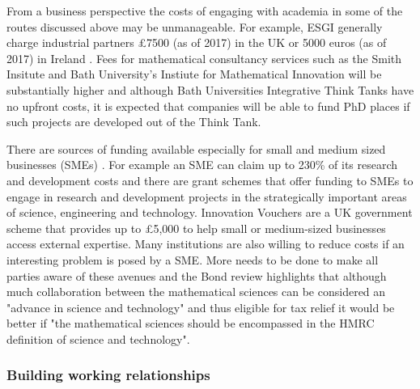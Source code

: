 \documentclass[11pt]{article} %
\begin{document}
	From a business perspective the costs of engaging with academia in some of the routes discussed above may be unmanageable. For example, ESGI generally charge industrial partners  £7500 (as of 2017) in the UK or 5000  euros (as of 2017) in Ireland \cite{ESGIhandbook}. Fees for mathematical consultancy services such as the Smith Insitute and Bath University's Instiute for Mathematical Innovation will be substantially higher and although Bath Universities Integrative Think Tanks have no upfront costs, it is expected that companies will be able to fund PhD places if such projects are developed out of the Think Tank. 
	
	There are sources of funding available especially for small and medium sized businesses (SMEs) \cite{IMI}. For example an SME can claim up to 230\% of its research and development costs \cite{Gov}  and there are grant schemes that offer funding to SMEs to engage in research and development projects in the strategically important areas of science, engineering and technology. Innovation Vouchers are a UK government scheme that	provides up to £5,000 to help small or medium-sized
	businesses access external expertise. Many institutions are also willing to reduce costs if an interesting problem is posed by a SME. More needs to be done to make all parties aware of these avenues and the Bond review \cite{Bond} highlights that although much collaboration between the mathematical sciences can be considered an "advance in science and technology" and thus eligible for tax relief it would be better if "the mathematical sciences should be encompassed in the HMRC definition of science and technology".
	
	
	\subsubsection{Building working relationships}
	
\end{document}
